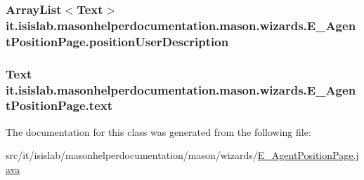 \hypertarget{classit_1_1isislab_1_1masonhelperdocumentation_1_1mason_1_1wizards_1_1_e___agent_position_page_af9f6fb6ec50925fea7b1bf932718c3af}{
\subsubsection[{position\-User\-Description}]{\setlength{\rightskip}{0pt plus 5cm}Array\-List$<$Text$>$ it.\-isislab.\-masonhelperdocumentation.\-mason.\-wizards.\-E\-\_\-\-Agent\-Position\-Page.\-position\-User\-Description\hspace{0.3cm}{\ttfamily [private]}}}\label{classit_1_1isislab_1_1masonhelperdocumentation_1_1mason_1_1wizards_1_1_e___agent_position_page_af9f6fb6ec50925fea7b1bf932718c3af}
\hypertarget{classit_1_1isislab_1_1masonhelperdocumentation_1_1mason_1_1wizards_1_1_e___agent_position_page_af6426f8de0e43846a74703addf28a63a}{
\subsubsection[{text}]{\setlength{\rightskip}{0pt plus 5cm}Text it.\-isislab.\-masonhelperdocumentation.\-mason.\-wizards.\-E\-\_\-\-Agent\-Position\-Page.\-text\hspace{0.3cm}{\ttfamily [private]}}}\label{classit_1_1isislab_1_1masonhelperdocumentation_1_1mason_1_1wizards_1_1_e___agent_position_page_af6426f8de0e43846a74703addf28a63a}


The documentation for this class was generated from the following file\-:\begin{DoxyCompactItemize}
\item 
src/it/isislab/masonhelperdocumentation/mason/wizards/\hyperlink{_e___agent_position_page_8java}{E\-\_\-\-Agent\-Position\-Page.\-java}\end{DoxyCompactItemize}
